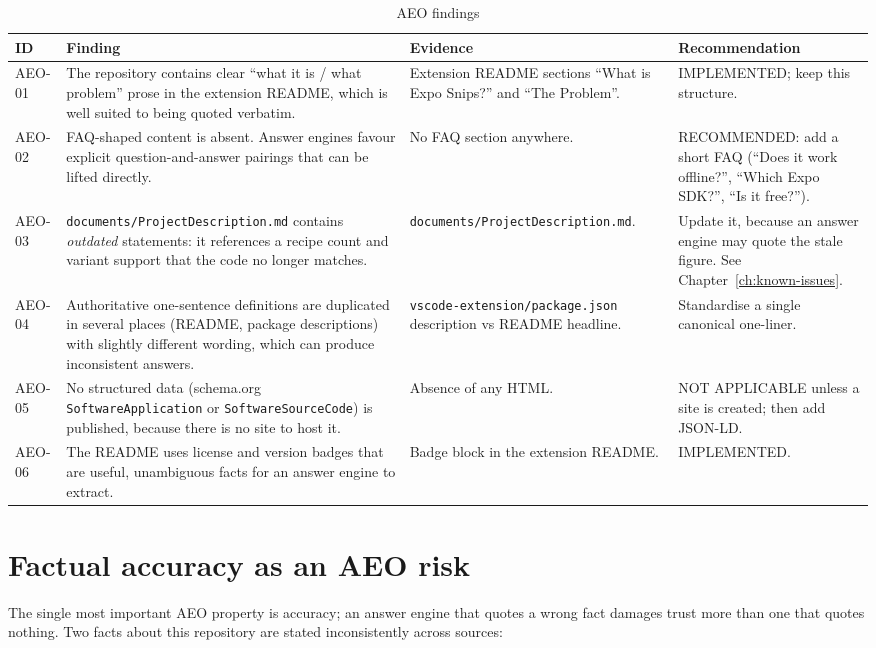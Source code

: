 \begin{longtable}{p{1.5cm}p{4.6cm}p{3.4cm}p{4.7cm}}
\caption{AEO findings}\\
\toprule
\textbf{ID} & \textbf{Finding} & \textbf{Evidence} & \textbf{Recommendation} \\
\midrule

AEO-01 & The repository contains clear ``what it is / what problem'' prose in the
extension README, which is well suited to being quoted verbatim. & Extension
README sections ``What is Expo Snips?'' and ``The Problem''. & IMPLEMENTED; keep
this structure. \\
AEO-02 & FAQ-shaped content is absent. Answer engines favour explicit question-and-answer
pairings that can be lifted directly. & No FAQ section anywhere. & RECOMMENDED:
add a short FAQ (``Does it work offline?'', ``Which Expo SDK?'', ``Is it free?''). \\
AEO-03 & \texttt{documents/ProjectDescription.md} contains \emph{outdated}
statements: it references a recipe count and variant support that the code no
longer matches. & \texttt{documents/ProjectDescription.md}. & Update it, because
an answer engine may quote the stale figure. See
Chapter~\ref{ch:known-issues}. \\
AEO-04 & Authoritative one-sentence definitions are duplicated in several places
(README, package descriptions) with slightly different wording, which can produce
inconsistent answers. & \texttt{vscode-extension/package.json} description vs
README headline. & Standardise a single canonical one-liner. \\
AEO-05 & No structured data (schema.org \texttt{SoftwareApplication} or
\texttt{SoftwareSourceCode}) is published, because there is no site to host it. &
Absence of any HTML. & NOT APPLICABLE unless a site is created; then add JSON-LD. \\
AEO-06 & The README uses license and version badges that are useful, unambiguous
facts for an answer engine to extract. & Badge block in the extension README. &
IMPLEMENTED. \\
\bottomrule
\end{longtable}

\section{Factual accuracy as an AEO risk}

The single most important AEO property is accuracy; an answer engine that quotes
a wrong fact damages trust more than one that quotes nothing. Two facts about
this repository are stated inconsistently across sources:

